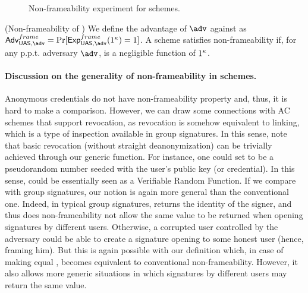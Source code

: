 \begin{figure}[htp!]
  \caption{Non-frameability experiment for \UAS schemes.}
  \label{fig:exp-uas-frame}
\end{figure}

\begin{definition}{(Non-frameability of \GSAC)}
  We define the advantage \AdvNonframe of $\adv$ against \ExpNonframe as
  $\AdvNonframe=\Pr\lbrack\ExpNonframe(1^\secpar)=1\rbrack$.
  A \GSAC scheme satisfies non-frameability if, for any p.p.t. adversary $\adv$,
  \AdvNonframe is a negligible function of $1^\kappa$.
\end{definition}

\paragraph{Discussion on the generality of non-frameability in \UAS schemes.} %
Anonymous credentials do not have non-frameability property and, thus, it is
hard to make a comparison. However, we can draw some connections with AC schemes
that support revocation, as revocation is somehow equivalent to linking, which
is a type of inspection available in group signatures. In this sense, note that
basic revocation (without straight deanonymization) can be trivially achieved
through our generic \Inspect function. For instance, one could set \finsp to
be a pseudorandom number seeded with the user's public key (or credential). In
this sense, \Inspect could be essentially seen as a Verifiable Random Function.
If we compare with group signatures, our notion is again more general than the
conventional one. Indeed, in typical group signatures, \Open returns the
identity of the signer, and thus does non-frameability not allow the same value
to be returned when opening signatures by different users. Otherwise, a
corrupted user controlled by the adversary could be able to create a signature
opening to some honest user (hence, framing him). But this is again possible
with our definition which, in case of making \Inspect equal \Open, becomes
equivalent to conventional non-frameability. However, it also allows more
generic situations in which signatures by different users may return the same
value. 

